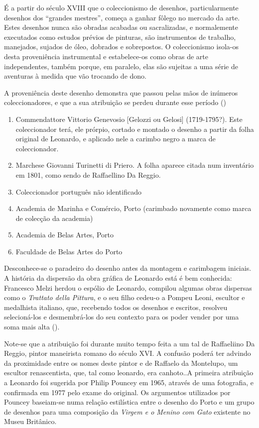 \documentclass{article}
\begin{document}
É a partir do século XVIII que o coleccionismo de desenhos,
particularmente desenhos dos ``grandes mestres'', começa a ganhar
fôlego no mercado da arte. Estes desenhos nunca são obradas acabadas
ou sacralizadas, e normalemente executados como estudos prévios de
pinturas, são instrumentos de trabalho, manejados, sujados de óleo,
dobrados e sobrepostos. O coleccionismo isola-os desta proveniência
instrumental e estabelece-os como obras de arte independentes, também
porque, em paralelo, elas são sujeitas a uma série de aventuras à
medida que vão trocando de dono.

A proveniência deste desenho demonstra que passou pelas mãos de
inúmeros coleccionadores, e que a sua atribuição se perdeu durante
esse período (\cite{desenhos-europeus})
\begin{enumerate}
\item Commendattore Vittorio Genevosio [Gelozzi ou Gelosi]
  (1719-1795?). Este coleccionador terá, ele prórpio, cortado e
  montado o desenho a partir da folha original de Leonardo, e aplicado
  nele a carimbo negro a marca de coleccionador.
  \item Marchese Giovanni Turinetti di Priero. A folha aparece citada
    num inventário em 1801, como sendo de Raffaellino Da Reggio.
  \item Coleccionador português não identificado
  \item Academia de Marinha e Comércio, Porto (carimbado novamente
    como marca de colecção da academia)
  \item Academia de Belas Artes, Porto
  \item Faculdade de Belas Artes do Porto
\end{enumerate}

Desconhece-se o paradeiro do desenho antes da montagem e carimbagem
iniciais. A história da dispersão da obra gráfica de Leonardo está é
bem conhecida: Francesco Melzi herdou o espólio de Leonardo, compilou
algumas obras dispersas como o \emph{Trattato della Pittura}, e o seu
filho cedeu-o a Pompeu Leoni, escultor e medalhista italiano, que,
recebendo todos os desenhos e escritos, resolveu selecioná-los e
desmembrá-los do seu contexto para os poder vender por uma soma mais
alta (\cite{wiki-leoni}).

Note-se que a atribuição foi durante muito tempo feita a um tal de
Raffaeliino Da Reggio, pintor maneirista romano do século XVI. A
confusão poderá ter advindo da proximidade entre os nomes deste pintor
e de Raffaelo da Montelupo, um escultor renascentista, que, tal como 
leonardo, era canhoto..A primeira atribuição a Leonardo foi sugerida
por Philip Pouncey em 1965, através de uma fotografia, e confirmada em
1977 pelo exame do original. Os argumentos utilizados por Pouncey
baseiam-se numa relação estilística entre o desenho do Porto e um
grupo de desenhos para uma composição da \emph{Virgem e o Menino com
  Gato} existente no Museu Britânico.
\end{document}
